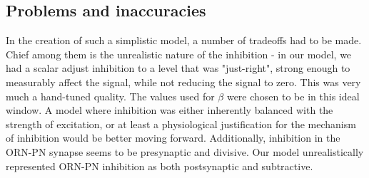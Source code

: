 \documentclass[a4paper,12pt,twoside]{article}
\begin{document}
\subsection{Problems and inaccuracies}
In the creation of such a simplistic model, a number of tradeoffs had to be made.  Chief among them is the unrealistic nature of the inhibition - in our model, we had a scalar adjust inhibition to a level that was "just-right", strong enough to measurably affect the signal, while not reducing the signal to zero.  This was very much a hand-tuned quality.  The values used for $\beta$ were chosen to be in this ideal window.  A model where inhibition was either inherently balanced with the strength of excitation, or at least a physiological justification for the mechanism of inhibition would be better moving forward.  Additionally, inhibition in the ORN-PN synapse seems to be presynaptic and divisive\cite{Nagel2015}.  Our model unrealistically represented ORN-PN inhibition as both postsynaptic and subtractive.  

\FloatBarrier

\def\bibfont{\footnotesize}

\end{document}
